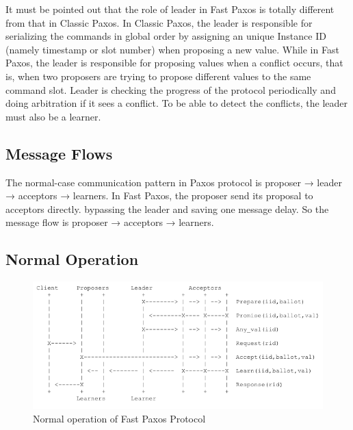 \noindent It must be pointed out that the role of leader in Fast Paxos is totally different from that in Classic Paxos. In Classic Paxos, the leader is responsible for serializing the commands in global order by assigning an unique Instance ID (namely timestamp or slot number) when proposing a new value. While in Fast Paxos, the leader is responsible for proposing values when a conflict occurs, that is, when two proposers are trying to propose different values to the same command slot. Leader is checking the progress of the protocol periodically and doing arbitration if it sees a conflict. To be able to detect the conflicts, the leader must also be a learner.    

\subsection{Message Flows}
\noindent The normal-case communication pattern in Paxos protocol is proposer → leader → acceptors → learners. In Fast Paxos, the proposer send its proposal to acceptors directly. bypassing the leader and saving one message delay. So the message flow is proposer → acceptors → learners. 
\\

\subsection{Normal Operation}

\begin{figure}[ht!]
\centering
\includegraphics[width=160mm]{FP_no-conflict.png}
\caption{Normal operation of Fast Paxos Protocol}
\label{normalpax}
\end{figure}

